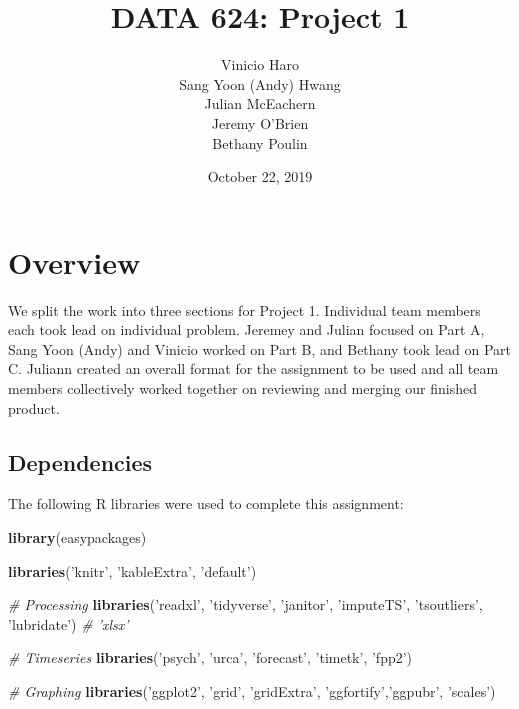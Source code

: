 \documentclass[openany]{book}
\title{DATA 624: Project 1}
\author{Vinicio Haro \\ Sang Yoon (Andy) Hwang \\ Julian McEachern \\ Jeremy O'Brien \\ Bethany Poulin}
\date{October 22, 2019}
\newenvironment{Shaded}{\begin{snugshade}}{\end{snugshade}}
\newcommand{\CommentTok}[1]{\textcolor[rgb]{0.56,0.35,0.01}{\textit{#1}}}
\newcommand{\KeywordTok}[1]{\textcolor[rgb]{0.13,0.29,0.53}{\textbf{#1}}}
\newcommand{\NormalTok}[1]{#1}
\newcommand{\StringTok}[1]{\textcolor[rgb]{0.31,0.60,0.02}{#1}}
\begin{document}
\maketitle

{
\setcounter{tocdepth}{1}
\tableofcontents
}
\hypertarget{overview}{%
\chapter*{Overview}\label{overview}}

We split the work into three sections for Project 1. Individual team
members each took lead on individual problem. Jeremey and Julian focused
on Part A, Sang Yoon (Andy) and Vinicio worked on Part B, and Bethany
took lead on Part C. Juliann created an overall format for the
assignment to be used and all team members collectively worked together
on reviewing and merging our finished product.

\hypertarget{dependencies}{%
\section*{Dependencies}\label{dependencies}}

The following R libraries were used to complete this assignment:

\begin{Shaded}
\begin{Highlighting}[]
\KeywordTok{library}\NormalTok{(easypackages)}

\KeywordTok{libraries}\NormalTok{(}\StringTok{'knitr'}\NormalTok{, }\StringTok{'kableExtra'}\NormalTok{, }\StringTok{'default'}\NormalTok{)}

\CommentTok{# Processing}
\KeywordTok{libraries}\NormalTok{(}\StringTok{'readxl'}\NormalTok{, }\StringTok{'tidyverse'}\NormalTok{, }\StringTok{'janitor'}\NormalTok{, }\StringTok{'imputeTS'}\NormalTok{, }\StringTok{'tsoutliers'}\NormalTok{, }\StringTok{'lubridate'}\NormalTok{)}
\CommentTok{# 'xlsx'}

\CommentTok{# Timeseries }
\KeywordTok{libraries}\NormalTok{(}\StringTok{'psych'}\NormalTok{, }\StringTok{'urca'}\NormalTok{, }\StringTok{'forecast'}\NormalTok{, }\StringTok{'timetk'}\NormalTok{, }\StringTok{'fpp2'}\NormalTok{)}

\CommentTok{# Graphing}
\KeywordTok{libraries}\NormalTok{(}\StringTok{'ggplot2'}\NormalTok{, }\StringTok{'grid'}\NormalTok{, }\StringTok{'gridExtra'}\NormalTok{, }\StringTok{'ggfortify'}\NormalTok{,}\StringTok{'ggpubr'}\NormalTok{, }\StringTok{'scales'}\NormalTok{)}
\end{Highlighting}
\end{Shaded}
\end{document}
